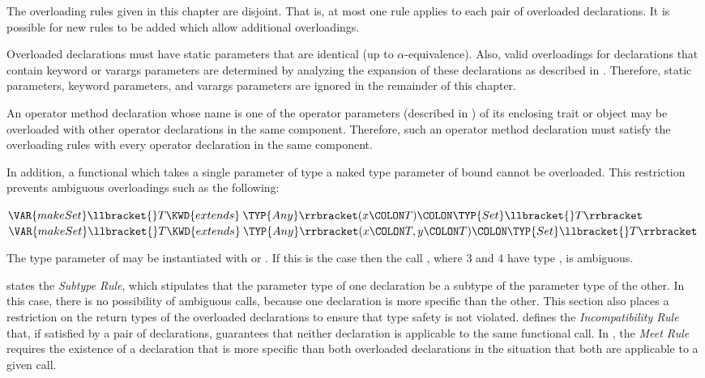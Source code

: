 The overloading rules given in this chapter are disjoint.  That is, at
most one rule applies to each pair of overloaded declarations.  It is
possible for new rules to be added which allow additional
overloadings.

\label{adv-over-kwd}
Overloaded declarations must have static parameters that are identical
(up to $\alpha$-equivalence).  Also, valid overloadings for
declarations that contain keyword or
varargs parameters are determined
by analyzing the expansion of these declarations as described in
.  Therefore, static
parameters, keyword parameters,
and varargs parameters are ignored in
the remainder of this chapter.

An operator method declaration whose name is one of the operator parameters
(described in )
of its enclosing trait or object may be overloaded with other operator
declarations in the same component.  Therefore, such an operator method
declaration must satisfy the overloading rules
with every operator declaration in the same component.



In addition, a functional which takes a single parameter of type
a naked type parameter of bound  cannot be
overloaded.  This restriction prevents ambiguous overloadings such as
the following:
\begin{Fortress}
\(\VAR{makeSet}\llbracket{}T \KWD{extends}\mskip 4mu plus 4mu\TYP{Any}\rrbracket(x\COLON T)\COLON \TYP{Set}\llbracket{}T\rrbracket\)\\
\(\VAR{makeSet}\llbracket{}T \KWD{extends}\mskip 4mu plus 4mu\TYP{Any}\rrbracket(x\COLON T, y\COLON T)\COLON \TYP{Set}\llbracket{}T\rrbracket\)
\end{Fortress}
The type parameter of  may be instantiated with
 or .  If this is the
case then the call , where 3 and 4 have type
, is ambiguous.

 states the \emph{Subtype Rule}, which stipulates
that the parameter type of one declaration be a subtype of the
parameter type of the other.  In this case, there is no possibility of
ambiguous calls, because one declaration is more specific than the
other.  This section also places a restriction on the return types of
the overloaded declarations to ensure that type safety is not
violated.   defines the \emph{
Incompatibility Rule} that, if satisfied by a pair of declarations,
guarantees that neither declaration is applicable to the same
functional call.  In , the \emph{Meet Rule}
requires the existence of a declaration that is more specific than
both overloaded declarations in the situation that both are applicable
to a given call.


